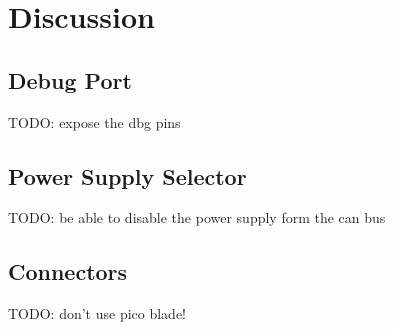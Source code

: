 \section{Discussion}
\subsection{Debug Port}
  TODO: expose the dbg pins 
\subsection{Power Supply Selector}
  TODO: be able to disable the power supply form the can bus
\subsection{Connectors}
  TODO: don't use pico blade!
